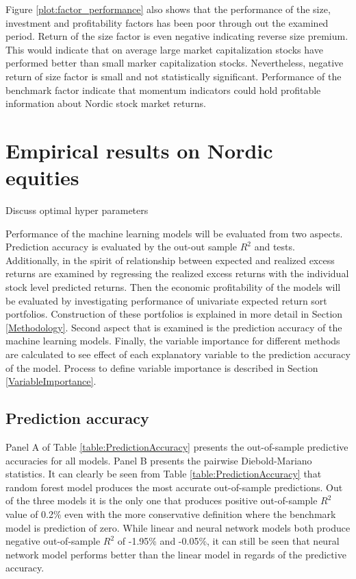 \documentclass[12pt]{article}
\begin{document}
Figure \ref{plot:factor_performance} also shows that the performance of the size, investment and profitability factors has been poor through out the examined period. Return of the size factor is even negative indicating reverse size premium. This would indicate that on average large market capitalization stocks have performed better than small marker capitalization stocks. Nevertheless, negative return of size factor is small and not statistically significant. Performance of the benchmark factor indicate that momentum indicators could hold profitable information about Nordic stock market returns. \par

\section{Empirical results on Nordic equities}

Discuss optimal hyper parameters

Performance of the machine learning models will be evaluated from two aspects. Prediction accuracy is evaluated by the out-out sample $R^2$ and \citet{Diebold1995} tests. Additionally, in the spirit of \citet{Lewellen2015} relationship between expected and realized excess returns are examined by regressing the realized excess returns with the individual stock level predicted returns. Then the economic profitability of the models will be evaluated by investigating performance of univariate expected return sort portfolios. Construction of these portfolios is explained in more detail in Section \ref{Methodology}. Second aspect that is examined is the prediction accuracy of the machine learning models.  Finally, the variable importance for different methods are calculated to see effect of each explanatory variable to the prediction accuracy of the model. Process to define variable importance is described in Section \ref{VariableImportance}. \par

\subsection{Prediction accuracy}\label{PredictionAccuracy}

Panel A of Table \ref{table:PredictionAccuracy} presents the out-of-sample predictive accuracies for all models. Panel B presents the pairwise Diebold-Mariano statistics. It can clearly be seen from Table \ref{table:PredictionAccuracy} that random forest model produces the most accurate out-of-sample predictions. Out of the three models it is the only one that produces positive out-of-sample $R^2$ value of 0.2\% even with the more conservative definition where the benchmark model is prediction of zero. While linear and neural network models both produce negative out-of-sample $R^2$ of -1.95\% and -0.05\%, it can still be seen that neural network model performs better than the linear model in regards of the predictive accuracy. \par
\end{document}
